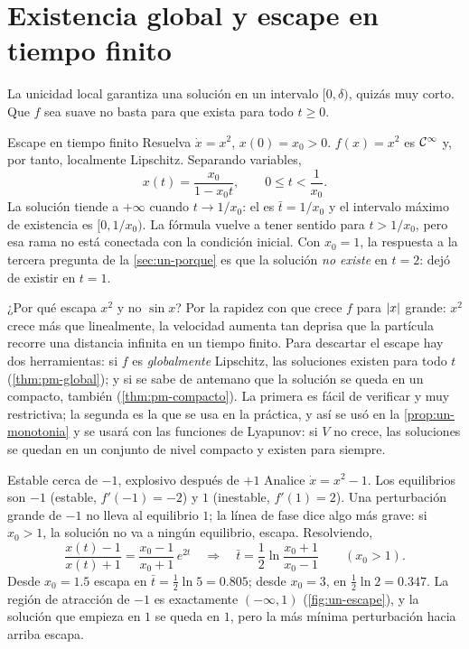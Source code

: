 \section{Existencia global y escape en tiempo finito}
\label{sec:un-escape}

La unicidad local garantiza una solución en un intervalo $[0,\delta)$, quizás muy corto. Que $f$ sea suave no basta para que exista para todo $t\ge0$.

\begin{ejemplo}[label=ej:un-escape]{Escape en tiempo finito}
Resuelva $\dot x=x^2$, $x(0)=x_0>0$.
\solucion $f(x)=x^2$ es $\mathcal{C}^{\infty}$ y, por tanto, localmente Lipschitz. Separando variables,
\[
  x(t)=\frac{x_0}{1-x_0t},\qquad 0\le t<\frac1{x_0} .
\]
La solución tiende a $+\infty$ cuando $t\to1/x_0$: el  es $\bar t=1/x_0$ y el intervalo máximo de existencia es $[0,1/x_0)$. La fórmula vuelve a tener sentido para $t>1/x_0$, pero esa rama no está conectada con la condición inicial. Con $x_0=1$, la respuesta a la tercera pregunta de la \cref{sec:un-porque} es que la solución \emph{no existe} en $t=2$: dejó de existir en $t=1$.
\end{ejemplo}

¿Por qué escapa $x^2$ y no $\sin x$? Por la rapidez con que crece $f$ para $\left\lvert x\right\rvert$ grande: $x^2$ crece más que linealmente, la velocidad aumenta tan deprisa que la partícula recorre una distancia infinita en un tiempo finito. Para descartar el escape hay dos herramientas: si $f$ es \emph{globalmente} Lipschitz, las soluciones existen para todo $t$ (\cref{thm:pm-global}); y si se sabe de antemano que la solución se queda en un compacto, también (\cref{thm:pm-compacto}). La primera es fácil de verificar y muy restrictiva; la segunda es la que se usa en la práctica, y así se usó en la \cref{prop:un-monotonia} y se usará con las funciones de Lyapunov: si $V$ no crece, las soluciones se quedan en un conjunto de nivel compacto y existen para siempre.

\begin{ejemplo}[label=ej:un-x2menos1]{Estable cerca de $-1$, explosivo después de $+1$}
Analice $\dot x=x^2-1$.
\solucion Los equilibrios son $-1$ (estable, $f'(-1)=-2$) y $1$ (inestable, $f'(1)=2$). Una perturbación grande de $-1$ no lleva al equilibrio $1$; la línea de fase dice algo más grave: si $x_0>1$, la solución no va a ningún equilibrio, escapa. Resolviendo,
\[
  \frac{x(t)-1}{x(t)+1}=\frac{x_0-1}{x_0+1}\,e^{2t}\quad\Longrightarrow\quad\bar t=\frac12\ln\frac{x_0+1}{x_0-1}\qquad(x_0>1) .
\]
Desde $x_0=1.5$ escapa en $\bar t=\tfrac12\ln5=0.805$; desde $x_0=3$, en $\tfrac12\ln2=0.347$. La región de atracción de $-1$ es exactamente $(-\infty,1)$ (\cref{fig:un-escape}), y la solución que empieza en $1$ se queda en $1$, pero la más mínima perturbación hacia arriba escapa.
\end{ejemplo}

